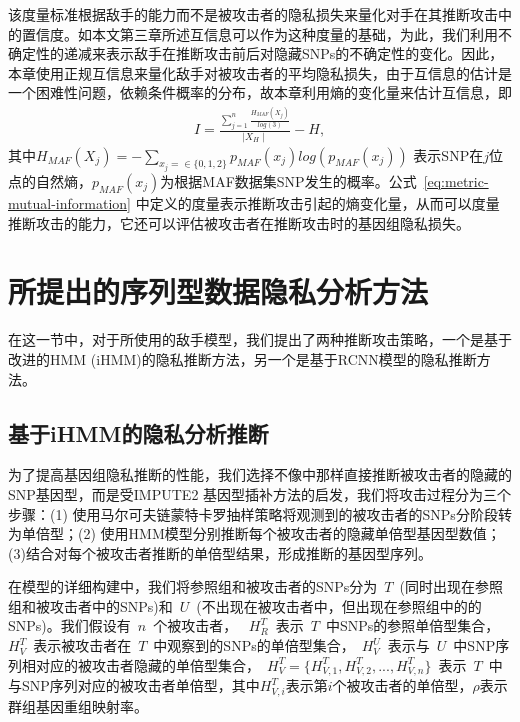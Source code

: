 该度量标准根据敌手的能力而不是被攻击者的隐私损失来量化对手在其推断攻击中的置信度。如本文第三章所述互信息可以作为这种度量的基础，为此，我们利用不确定性的递减来表示敌手在推断攻击前后对隐藏SNPs的不确定性的变化。因此，本章使用正规互信息来量化敌手对被攻击者的平均隐私损失，由于互信息的估计是一个困难性问题，依赖条件概率的分布，故本章利用熵的变化量来估计互信息，即
\begin{align}\label{eq:metric-mutual-information}
I = \frac{\sum_{j=1}^n \frac{H_{MAF}(X_j)}{log(3)}}{\mid X_H \mid}
- H,
\end{align}
其中$H_{MAF}(X_j) = -\sum_{x_j=\in \{0,1,2\}}{p_{MAF}(x_j)log(p_{MAF}(x_j))}$ 表示SNP在$j$位点的自然熵，$p_{MAF}(x_j)$为根据MAF数据集SNP发生的概率。公式~\ref{eq:metric-mutual-information} 中定义的度量表示推断攻击引起的熵变化量，从而可以度量推断攻击的能力，它还可以评估被攻击者在推断攻击时的基因组隐私损失。

\section{所提出的序列型数据隐私分析方法}\label{sec:infer}

在这一节中，对于所使用的敌手模型，我们提出了两种推断攻击策略，一个是基于改进的HMM (iHMM)的隐私推断方法，另一个是基于RCNN模型的隐私推断方法。

\subsection{基于iHMM的隐私分析推断}

为了提高基因组隐私推断的性能，我们选择不像\cite{samani2015quantifying}中那样直接推断被攻击者的隐藏的SNP基因型，而是受IMPUTE2 \cite{howie2009flexible}基因型插补方法的启发，我们将攻击过程分为三个步骤：(1) 使用马尔可夫链蒙特卡罗抽样策略将观测到的被攻击者的SNPs分阶段转为单倍型；(2) 使用HMM模型分别推断每个被攻击者的隐藏单倍型基因型数值；(3)结合对每个被攻击者推断的单倍型结果，形成推断的基因型序列。


在模型的详细构建中，我们将参照组和被攻击者的SNPs分为~$T$~(同时出现在参照组和被攻击者中的SNPs)和~$U$~(不出现在被攻击者中，但出现在参照组中的的SNPs)。我们假设有~$n$~个被攻击者， ~$H_R^T$~表示~$T$~中SNPs的参照单倍型集合，~$H_V^T$~表示被攻击者在~$T$~中观察到的SNPs的单倍型集合，~$H_V^U$~表示与~$U$~中SNP序列相对应的被攻击者隐藏的单倍型集合，~$H_V^T=\{H_{V,1}^T,H_{V,2}^T,..., H_{V,n}^T\}$~表示~$T$~中与SNP序列对应的被攻击者单倍型，其中$H_{V,i}^T$表示第$i$个被攻击者的单倍型，$\rho$表示群组基因重组映射率。

